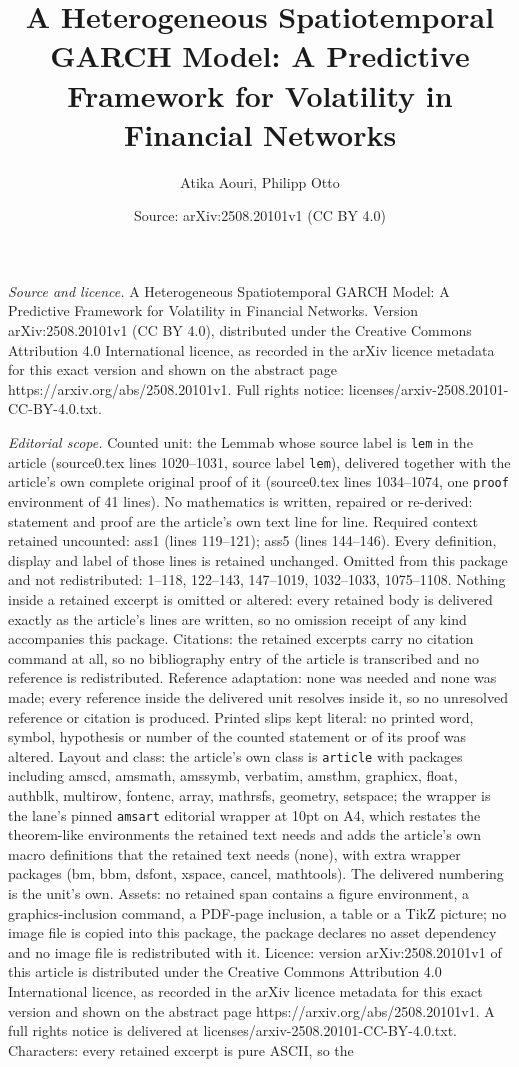 \documentclass[10pt,a4paper]{amsart}
\title[A Heterogeneous Spatiotemporal GARCH Model: A Predictive Fra]{A Heterogeneous Spatiotemporal GARCH Model: A Predictive Framework for Volatility in Financial Networks}
\author{Atika Aouri, Philipp Otto}
\date{Source: arXiv:2508.20101v1 (CC BY 4.0)}
\begin{document}
\maketitle

\noindent\emph{Source and licence.} A Heterogeneous Spatiotemporal GARCH Model: A Predictive Framework for Volatility in Financial Networks. Version arXiv:2508.20101v1 (CC BY 4.0), distributed under the Creative Commons Attribution 4.0 International licence, as recorded in the arXiv licence metadata for this exact version and shown on the abstract page https://arxiv.org/abs/2508.20101v1. Full rights notice: licenses/arxiv-2508.20101-CC-BY-4.0.txt.\par\smallskip

\noindent\textit{Editorial scope.} Counted unit: the Lemmab whose source label is \texttt{lem} in the article (source0.tex lines 1020--1031, source label \texttt{lem}), delivered together with the article's own complete original proof of it (source0.tex lines 1034--1074, one \texttt{proof} environment of 41 lines). No mathematics is written, repaired or re-derived: statement and proof are the article's own text line for line. Required context retained uncounted: ass1 (lines 119--121); ass5 (lines 144--146). Every definition, display and label of those lines is retained unchanged. Omitted from this package and not redistributed: 1--118, 122--143, 147--1019, 1032--1033, 1075--1108. Nothing inside a retained excerpt is omitted or altered: every retained body is delivered exactly as the article's lines are written, so no omission receipt of any kind accompanies this package. Citations: the retained excerpts carry no citation command at all, so no bibliography entry of the article is transcribed and no reference is redistributed. Reference adaptation: none was needed and none was made; every reference inside the delivered unit resolves inside it, so no unresolved reference or citation is produced. Printed slips kept literal: no printed word, symbol, hypothesis or number of the counted statement or of its proof was altered. Layout and class: the article's own class is \texttt{article} with packages including amscd, amsmath, amssymb, verbatim, amsthm, graphicx, float, authblk, multirow, fontenc, array, mathrsfs, geometry, setspace; the wrapper is the lane's pinned \texttt{amsart} editorial wrapper at 10pt on A4, which restates the theorem-like environments the retained text needs and adds the article's own macro definitions that the retained text needs (none), with extra wrapper packages (bm, bbm, dsfont, xspace, cancel, mathtools). The delivered numbering is the unit's own. Assets: no retained span contains a figure environment, a graphics-inclusion command, a PDF-page inclusion, a table or a TikZ picture; no image file is copied into this package, the package declares no asset dependency and no image file is redistributed with it. Licence: version arXiv:2508.20101v1 of this article is distributed under the Creative Commons Attribution 4.0 International licence, as recorded in the arXiv licence metadata for this exact version and shown on the abstract page https://arxiv.org/abs/2508.20101v1. A full rights notice is delivered at licenses/arxiv-2508.20101-CC-BY-4.0.txt. Characters: every retained excerpt is pure ASCII, so the 
\end{document}
